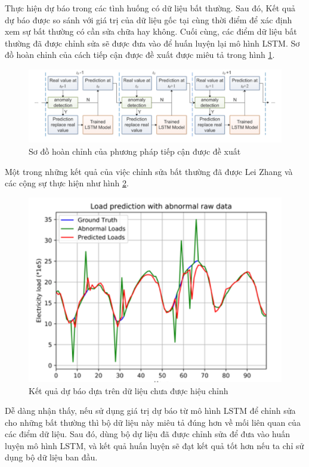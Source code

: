 Thực hiện dự báo trong các tình huống có dữ liệu bất thường. Sau đó, Kết quả dự báo được so sánh với giá trị của dữ liệu gốc tại cùng thời điểm để xác định xem sự bất thường có cần sửa chữa hay không. Cuối cùng, các điểm dữ liệu bất thường đã được chỉnh sửa sẽ được đưa vào để huấn luyện lại mô hình LSTM. Sơ đồ hoàn chỉnh của cách tiếp cận được đề xuất được miêu tả trong hình \ref{fig:3-12}.

\begin{figure}[H]
    \centering
    \includegraphics[scale=1.05]{./content/images/3-12.png}
    \caption{Sơ đồ hoàn chỉnh của phương pháp tiếp cận được đề xuất \cite{st31}}
    \label{fig:3-12}
\end{figure}

Một trong những kết quả của việc chỉnh sửa bất thường đã được Lei Zhang và các cộng sự thực hiện như hình \ref{fig:3-13}.

\begin{figure}[H]
    \centering
    \includegraphics[scale=1.25]{./content/images/3-13.png}
    \caption{Kết quả dự báo dựa trên dữ liệu chưa được hiệu chỉnh \cite{st31}}
    \label{fig:3-13}
\end{figure}

Dễ dàng nhận thấy, nếu sử dụng giá trị dự báo từ mô hình LSTM để chỉnh sửa cho những bất thường thì bộ dữ liệu này miêu tả đúng hơn về mối liên quan của các điểm dữ liệu. Sau đó, dùng bộ dự liệu đã được chỉnh sửa để đưa vào huấn luyện mô hình LSTM, và kết quả huấn luyện sẽ đạt kết quả tốt hơn nếu ta chỉ sử dụng bộ dữ liệu ban đầu.

